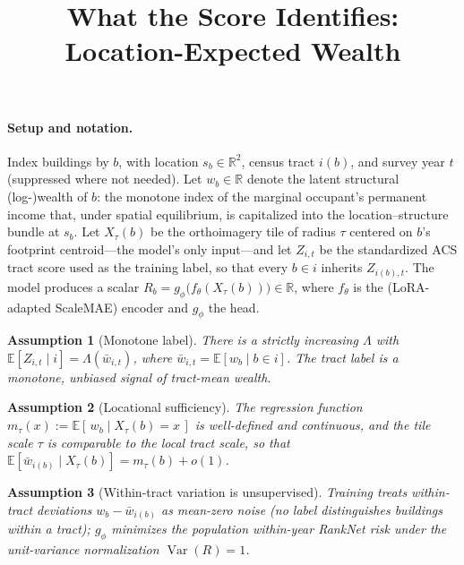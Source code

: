 \documentclass[11pt]{article}
\title{\vspace{-3em}What the Score Identifies: \\ Location-Expected Wealth}
\author{}
\date{}
\theoremstyle{plain}
\newtheorem{assumption}{Assumption}
\theoremstyle{remark}
\newcommand{\E}{\mathbb{E}}
\newcommand{\Var}{\operatorname{Var}}
\newcommand{\R}{\mathbb{R}}
\newcommand{\Xt}{X_\tau}
\begin{document}
\maketitle
\vspace{-3em}

\paragraph{Setup and notation.}
Index buildings by $b$, with location $s_b\in\R^2$, census tract $i(b)$, and survey
year $t$ (suppressed where not needed). Let $w_b\in\R$ denote the latent structural
(log-)wealth of $b$: the monotone index of the marginal occupant's permanent income
that, under spatial equilibrium, is capitalized into the location--structure bundle
at $s_b$. Let $\Xt(b)$ be the orthoimagery tile of radius $\tau$ centered on $b$'s
footprint centroid---the model's only input---and let $Z_{i,t}$ be the standardized
ACS tract score used as the training label, so that every $b\in i$ inherits
$Z_{i(b),t}$. The model produces a scalar
$R_b = g_\phi\!\big(f_\theta(\Xt(b))\big)\in\R$, where $f_\theta$ is the
(LoRA-adapted ScaleMAE) encoder and $g_\phi$ the head.

\begin{assumption}[Monotone label]\label{a:label}
There is a strictly increasing $\Lambda$ with
$\E[Z_{i,t}\mid i]=\Lambda(\bar w_{i,t})$, where
$\bar w_{i,t}=\E[w_b\mid b\in i]$. The tract label is a monotone, unbiased signal of
tract-mean wealth.
\end{assumption}

\begin{assumption}[Locational sufficiency]\label{a:smooth}
The regression function
$m_\tau(x):=\E[\,w_b \mid \Xt(b)=x\,]$ is well-defined and continuous, and the tile
scale $\tau$ is comparable to the local tract scale, so that
$\E[\bar w_{i(b)}\mid \Xt(b)] = m_\tau(b)+o(1)$.
\end{assumption}

\begin{assumption}[Within-tract variation is unsupervised]\label{a:noise}
Training treats within-tract deviations $w_b-\bar w_{i(b)}$ as mean-zero noise (no
label distinguishes buildings within a tract); $g_\phi$ minimizes the population
within-year RankNet risk under the unit-variance normalization $\Var(R)=1$.
\end{assumption}
\end{document}

